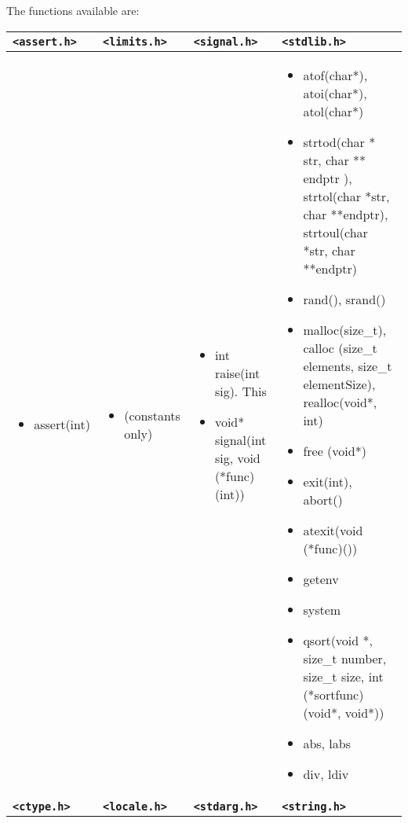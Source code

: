 The functions available are:
\begin{table*}[h]
\scriptsize
\begin{tabular}{|p{3cm}|p{3cm}|p{3cm}|p{6.5cm}|}
\hline
\textbf{ \texttt{\textless{}assert.h\textgreater{}}} & \textbf{ \texttt{\textless{}limits.h\textgreater{}}} & \textbf{ \texttt{\textless{}signal.h\textgreater{}}} & \textbf{ \texttt{\textless{}stdlib.h\textgreater{}}} \\ \hline
\begin{itemize}
\setlength{\itemsep}{0cm}
\setlength{\parskip}{0cm}
	\item assert(int)
\end{itemize}
 &  \begin{itemize}
\setlength{\itemsep}{0cm}
\setlength{\parskip}{0cm}
	\item (constants only)
\end{itemize}
 &  \begin{itemize}
\setlength{\itemsep}{0cm}
\setlength{\parskip}{0cm}
\setlength{\itemsep}{0cm}
\setlength{\parskip}{0cm}
	\item int raise(int sig). This
	\item void* signal(int sig, void (*func)(int))
\end{itemize}
 &  \begin{itemize}
\setlength{\itemsep}{0cm}
\setlength{\parskip}{0cm}
\setlength{\itemsep}{0cm}
\setlength{\parskip}{0cm}
	\item atof(char*), atoi(char*), atol(char*)
	\item strtod(char * str, char ** endptr ), strtol(char *str, char **endptr), strtoul(char *str, char **endptr)
	\item rand(), srand()
	\item malloc(size\_t), calloc (size\_t elements, size\_t elementSize), realloc(void*, int)
	\item free (void*)
	\item exit(int), abort()
	\item atexit(void (*func)())
	\item getenv
	\item system
	\item qsort(void *, size\_t number, size\_t size, int (*sortfunc)(void*, void*))
	\item abs, labs
	\item div, ldiv
\end{itemize}
 \\ \hline
		\textbf{ \texttt{\textless{}ctype.h\textgreater{}}} & \textbf{ \texttt{\textless{}locale.h\textgreater{}}} & \textbf{ \texttt{\textless{}stdarg.h\textgreater{}}} & \textbf{ \texttt{\textless{}string.h\textgreater{}}} \\ \hline

\end{tabular}
\end{table*}
